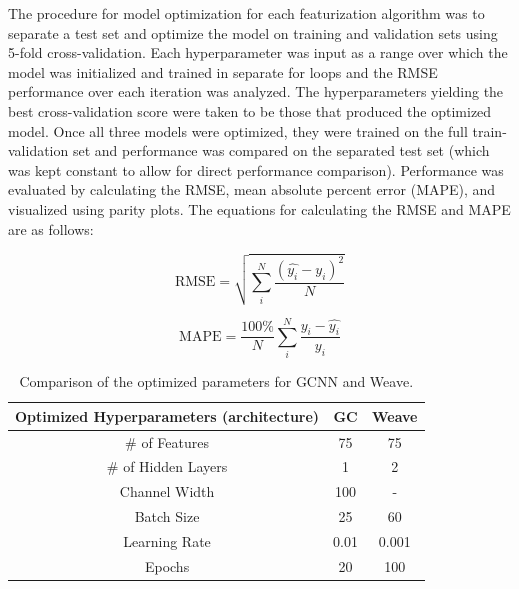 \documentclass[book.tex]{subfiles}
\begin{document}
The procedure for model optimization for each featurization algorithm was to separate a test set and optimize the model on training and validation sets using 5-fold cross-validation. Each hyperparameter was input as a range over which the model was initialized and trained in separate for loops and the RMSE performance over each iteration was analyzed. The hyperparameters yielding the best cross-validation score were taken to be those that produced the optimized model. Once all three models were optimized, they were trained on the full train-validation set and performance was compared on the separated test set (which was kept constant to allow for direct performance comparison). Performance was evaluated by calculating the RMSE, mean absolute percent error (MAPE), and visualized using parity plots. The equations for calculating the RMSE and MAPE are as follows:

\begin{equation}
    \text{RMSE} = \sqrt{\sum_i^N \frac{(\hat{y_i}-y_i)^2}{N}}
\end{equation}

\begin{equation}
    \text{MAPE} = \frac{100\%}{N} \sum^N_i \frac{y_i-\hat{y_i}}{y_i}
\end{equation}



\begin{table}
\begin{center}
\small
\begin{tabular}{|c|c|c|}
\hline
Optimized Hyperparameters (architecture)& GC & Weave\\
\hline\hline
\# of Features & 75 & 75\\
\# of Hidden Layers & 1 & 2\\
Channel Width & 100 & -\\
Batch Size & 25 & 60\\
Learning Rate & 0.01 & 0.001\\
Epochs & 20 & 100\\
\hline
\end{tabular}
\end{center}
\caption{Comparison of the optimized parameters for GCNN and Weave.}
\label{table:hyp_para}
\end{table}
\end{document}
